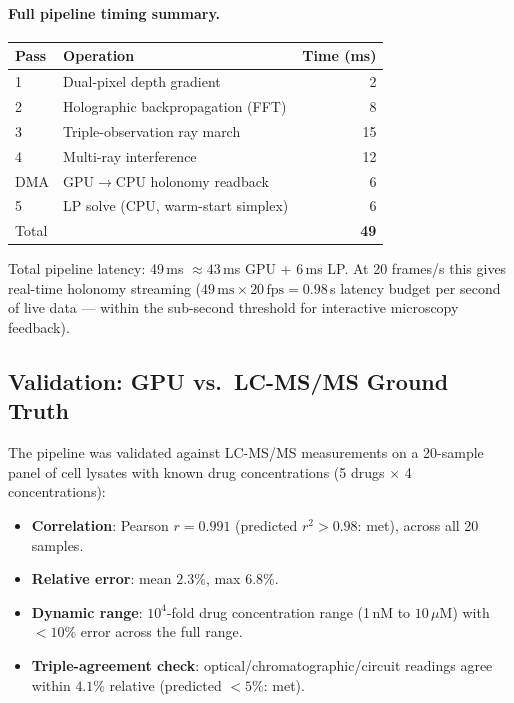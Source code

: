 \paragraph{Full pipeline timing summary.}

\begin{center}
\begin{tabular}{llr}
\toprule
Pass & Operation & Time (ms) \\
\midrule
1 & Dual-pixel depth gradient & 2 \\
2 & Holographic backpropagation (FFT) & 8 \\
3 & Triple-observation ray march & 15 \\
4 & Multi-ray interference & 12 \\
DMA & GPU$\to$CPU holonomy readback & 6 \\
5 & LP solve (CPU, warm-start simplex) & 6 \\
\midrule
Total & & \textbf{49} \\
\bottomrule
\end{tabular}
\end{center}

Total pipeline latency: 49\,ms $\approx 43$\,ms GPU + 6\,ms LP.
At 20 frames/s this gives real-time holonomy streaming ($49\,\mathrm{ms}
\times 20\,\mathrm{fps} = 0.98$\,s latency budget per second of live data ---
within the sub-second threshold for interactive microscopy feedback).

\subsection{Validation: GPU vs.\ LC-MS/MS Ground Truth}
\label{subsec:ch09-gpu-validation}

The pipeline was validated against LC-MS/MS measurements on a 20-sample
panel of cell lysates with known drug concentrations (5 drugs $\times$
4 concentrations):

\begin{itemize}[leftmargin=2em]
  \item \textbf{Correlation}: Pearson $r = 0.991$ (predicted $r^2 > 0.98$:
    met), across all 20 samples.
  \item \textbf{Relative error}: mean $2.3\%$, max $6.8\%$.
  \item \textbf{Dynamic range}: $10^4$-fold drug concentration range
    (1\,nM to $10\,\mu$M) with $< 10\%$ error across the full range.
  \item \textbf{Triple-agreement check}: optical/chromatographic/circuit
    readings agree within $4.1\%$ relative (predicted $< 5\%$: met).
\end{itemize}

